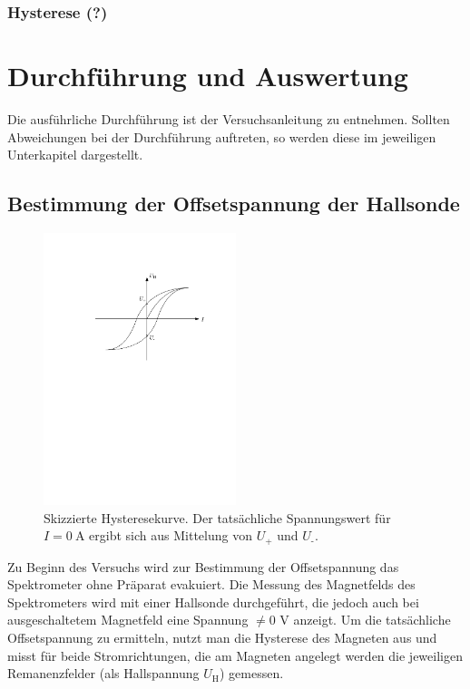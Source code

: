 \documentclass[11pt, a4paper]{article}
\numberwithin{equation}{section}
\begin{document}
\subsubsection{Hysterese (?)}


\section{Durchführung und Auswertung}
Die ausführliche Durchführung ist der Versuchsanleitung \cite{anleitung} zu entnehmen.
Sollten Abweichungen bei der Durchführung auftreten, so werden diese im jeweiligen Unterkapitel dargestellt.

\subsection{Bestimmung der Offsetspannung der Hallsonde}
\label{ssec:offsetspannung}
\begin{figure}
	\centering
	\includegraphics[width=0.5\textwidth]{./figures/hysterese.pdf}
	\caption{Skizzierte Hysteresekurve. Der tatsächliche Spannungswert für $I=\SI{0}{\ampere}$ ergibt sich aus Mittelung von $U_\text{+}$ und $U_\text{-}$.}
	\label{fig:hysterese}
\end{figure}
Zu Beginn des Versuchs wird zur Bestimmung der Offsetspannung das Spektrometer ohne Präparat evakuiert.
Die Messung des Magnetfelds des Spektrometers wird mit einer Hallsonde durchgeführt, die jedoch auch bei ausgeschaltetem Magnetfeld eine Spannung $\neq 0$ \si{\volt} anzeigt.
Um die tatsächliche Offsetspannung zu ermitteln, nutzt man die Hysterese des Magneten aus und misst für beide Stromrichtungen, die am Magneten angelegt werden die jeweiligen Remanenzfelder (als Hallspannung $U_\text{H}$) gemessen.
\end{document}
